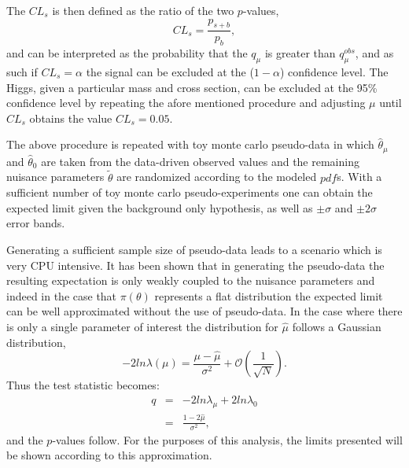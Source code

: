 The $CL_{s}$ is then defined as the ratio of the two $p$-values,
\begin{equation}
CL_{s} = \frac{p_{s+b}}{p_{b}},
\end{equation}
and can be interpreted as the probability that the $q_{\mu}$ is greater than $q_{\mu}^{obs}$, and as such if $CL_{s} = \alpha$ the signal can be excluded at the ($1-\alpha$) confidence level.
The Higgs, given a particular mass and cross section,  can be excluded at the 95\% confidence level by repeating the afore mentioned procedure and adjusting $\mu$ until $CL_{s}$ obtains the value $CL_{s} = 0.05$.

The above procedure is repeated with toy monte carlo pseudo-data in which $\hat{\theta}_{\mu}$ and $\hat{\theta}_{0}$ are taken from the data-driven observed values and the remaining nuisance parameters $\tilde{\theta}$ are randomized according to the modeled $pdf$s.
With a sufficient number of toy monte carlo pseudo-experiments one can obtain the expected limit given the background only hypothesis, as well as $\pm\sigma$ and $\pm 2\sigma$ error bands.

Generating a sufficient sample size of pseudo-data leads to a scenario which is very CPU intensive.
It has been shown that in generating the pseudo-data the resulting expectation is only weakly coupled to the nuisance parameters and indeed in the case that $\pi(\theta)$ represents a flat distribution the expected limit can be well approximated without the use of pseudo-data\cite{ASYMPTOTIC}.
In the case where there is only a single parameter of interest the distribution for $\hat{\mu}$ follows a Gaussian distribution,
\begin{equation}
- 2ln\lambda(\mu) = \frac{\mu - \hat{\mu}}{\sigma^{2}} + \mathcal{O}(\frac{1}{\sqrt{N}}).
\end{equation}
Thus the test statistic becomes:
\begin{eqnarray*}
q & = & -2ln\lambda_{\mu} + 2ln\lambda_{0} \\
  & = & \frac{1 - 2\hat{\mu}}{\sigma^{2}},
\end{eqnarray*}
and the $p$-values follow.
For the purposes of this analysis, the limits presented will be shown according to this approximation.

